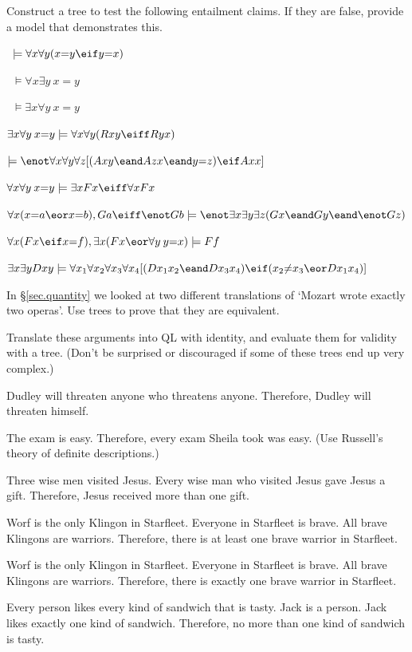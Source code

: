 \solutions
\problempart Construct a tree to test the following entailment claims. If they are false, provide a model that demonstrates this.
\label{pr.IdentityTrees}
\begin{earg}
\item\  $\models \forall x \forall y (x{=}y \eif y{=}x)$
\item\ $\models \forall x \exists y \: x{=}y$
\item\  $\models \exists x \forall y \: x{=}y$
\item   $\exists x \forall y \: x{=}y \models \forall x \forall y (Rxy \eiff Ryx)$
\item   $\models \enot \forall x \forall y \forall z [(Axy \eand Azx \eand y{=}z) \eif Axx] $
\item  $\forall x \forall y \: x{=}y \models \exists x Fx \eiff \forall x Fx$
\item $\forall x (x{=}a \eor x{=}b), Ga \eiff \enot Gb \models \enot \exists x \exists y \exists z (Gx \eand Gy \eand \enot Gz)$
\item $\forall x (Fx \eif x{=}f), \exists x (Fx \eor \forall y \: y{=}x) \models Ff$
\item $\exists x \exists y Dxy \models \forall x_{1} \forall x_{2} \forall x_{3} \forall x_{4} [(Dx_{1}x_{2} \eand Dx_{3}x_{4}) \eif (x_{2}{\neq}x_{3} \eor Dx_{1}x_{4})]$
\end{earg}

\problempart In \S \ref{sec.quantity} we looked at two different translations of `Mozart wrote exactly two operas'. Use trees to prove that they are equivalent.

\problempart Translate these arguments into QL with identity, and evaluate them for validity with a tree. (Don't be surprised or discouraged if some of these trees end up very complex.)
\label{pr.IdentityArguments}
\begin{earg}
\item Dudley will threaten anyone who threatens anyone. Therefore, Dudley will threaten himself.
\item The exam is easy. Therefore, every exam Sheila took was easy. (Use Russell's theory of definite descriptions.)
\item Three wise men visited Jesus. Every wise man who visited Jesus gave Jesus a gift. Therefore, Jesus received more than one gift.
\item Worf is the only Klingon in Starfleet. Everyone in Starfleet is brave. All brave Klingons are warriors. Therefore, there is at least one brave warrior in Starfleet.
\item Worf is the only Klingon in Starfleet. Everyone in Starfleet is brave. All brave Klingons are warriors. Therefore, there is exactly one brave warrior in Starfleet.
\item Every person likes every kind of sandwich that is tasty. Jack is a person. Jack likes exactly one kind of sandwich. Therefore, no more than one kind of sandwich is tasty.
\end{earg}